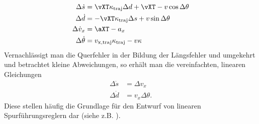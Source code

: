 \begin{subequations}
\begin{align}
 \Delta \dot s &=  \vXT\kappa_\mathrm{traj} \Delta d + \vXT- v  \cos \Delta \theta \\
 \Delta \dot d &=   - \vXT\kappa_\mathrm{traj} \Delta s +  v \sin \Delta \theta \\
 \Delta \dot v_x &= \aXT- a_x \\
 \Delta \dot \theta &=  v _\mathrm{x,traj} \kappa_\mathrm{traj} - v \kappa\label{eq_dgl_theta}
\end{align}
\end{subequations}
%
Vernachlässigt man die Querfehler in der Bildung der Längsfehler und umgekehrt und betrachtet kleine Abweichungen, so erhält man die vereinfachten, linearen Gleichungen
\begin{subequations}
\begin{align}
 \Delta \dot s &=   \Delta v_x \\
 \Delta \dot d &=    v_x  \Delta \theta.
 \label{eq_dgl_d}
\end{align}
\end{subequations}
Diese stellen häufig die Grundlage für den Entwurf von linearen Spurführungsreglern dar (siehe z.B.  \cite{Ackermann1995}).
%
%
